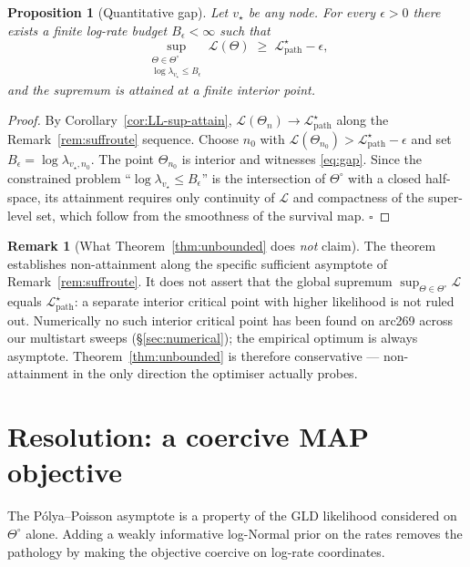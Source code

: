 \documentclass[11pt]{article}
\newcommand{\dup}{\lambda}             %
\newcommand{\Ll}{\mathcal{L}}
\newtheorem{proposition}[theorem]{Proposition}
\theoremstyle{definition}
\newtheorem{remark}[theorem]{Remark}
\begin{document}
\begin{proposition}[Quantitative gap]\label{prop:gap-quant}
Let $v_\star$ be any node. For every $\epsilon > 0$ there exists a
finite log-rate budget $B_\epsilon < \infty$ such that
\begin{equation}
\sup_{\substack{\Theta \in \Theta^\circ\\\log\dup_{v_\star} \le B_\epsilon}}
\Ll(\Theta)
\;\ge\;
\Ll^\star_{\mathrm{path}} - \epsilon,
\label{eq:gap}
\end{equation}
and the supremum is attained at a finite interior point.
\end{proposition}
\begin{proof}
By Corollary~\ref{cor:LL-sup-attain}, $\Ll(\Theta_n) \to \Ll^\star_{\mathrm{path}}$
along the Remark~\ref{rem:suffroute} sequence. Choose $n_0$ with
$\Ll(\Theta_{n_0}) > \Ll^\star_{\mathrm{path}} - \epsilon$ and set
$B_\epsilon = \log\dup_{v_\star, n_0}$.  The point $\Theta_{n_0}$ is
interior and witnesses \eqref{eq:gap}.  Since the constrained
problem ``$\log\dup_{v_\star} \le B_\epsilon$'' is the
intersection of $\Theta^\circ$ with a closed half-space, its
attainment requires only continuity of $\Ll$ and compactness of the
super-level set, which follow from the smoothness of the survival
map. $\square$
\end{proof}

\begin{remark}[What Theorem~\ref{thm:unbounded} does \emph{not} claim]
The theorem establishes non-attainment along the specific sufficient
asymptote of Remark~\ref{rem:suffroute}. It does not assert that
the global supremum
$\sup_{\Theta\in\Theta^\circ}\Ll$ equals $\Ll^\star_{\mathrm{path}}$:
a separate interior critical point with higher likelihood is not
ruled out. Numerically no such interior critical point has been
found on arc269 across our multistart sweeps
(\S\ref{sec:numerical}); the empirical optimum is always asymptote.
Theorem~\ref{thm:unbounded} is therefore conservative ---
non-attainment in the only direction the optimiser actually probes.
\end{remark}

\section{Resolution: a coercive MAP objective}
\label{sec:map}

The Pólya--Poisson asymptote is a property of the GLD likelihood
considered on $\Theta^\circ$ alone. Adding a weakly informative
log-Normal prior on the rates removes the pathology by making the
objective coercive on log-rate coordinates.
\end{document}
